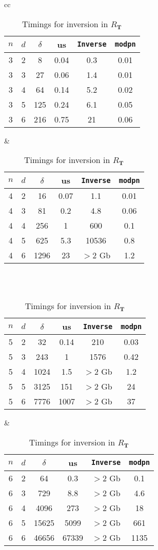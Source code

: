 \documentclass[12pt]{article}
\def\Tt {\ensuremath{\mathbf{T}}}
\begin{document}
\begin{table}
  \caption{Timings for inversion in $R_\Tt$}\label{table2}
  \begin{center}
  \begin{tabular}{cc}
  \begin{tabular}{c|c|c||c|c|c}
    $n$ & $d$ & $\delta$ & us & {\tt Inverse} & {\tt modpn} \\ \hline
3& 2& 8 & 0.04 & 0.3 & 0.01\\
3& 3& 27 & 0.06 & 1.4 & 0.01\\
3& 4& 64 & 0.14 & 5.2 & 0.02\\
3& 5& 125& 0.24& 6.1 & 0.05\\
3& 6& 216& 0.75& 21 & 0.06
  \end{tabular}
&
  \begin{tabular}{c|c|c||c|c|c}
    $n$ & $d$ & $\delta$ & us & {\tt Inverse} & {\tt modpn} \\ \hline
4& 2& 16& 0.07& 1.1& 0.01\\
4& 3& 81& 0.2 & 4.8 &0.06\\
4& 4& 256& 1& 600 & 0.1\\
4& 5& 625& 5.3& 10536& 0.8\\
4& 6& 1296& 23& $> 2$ Gb& 1.2
  \end{tabular} 
\\
\\
  \begin{tabular}{c|c|c||c|c|c}
    $n$ & $d$ & $\delta$ & us & {\tt Inverse} & {\tt modpn} \\ \hline
5& 2& 32  & 0.14 & 210 & 0.03\\
5& 3& 243  &1 & 1576 & 0.42\\
5& 4& 1024 &1.5& $> 2$ Gb &1.2\\
5& 5& 3125 &151 & $> 2$  Gb & 24\\
5& 6& 7776 &1007 & $> 2$  Gb & 37
  \end{tabular}
&
  \begin{tabular}{c|c|c||c|c|c}
    $n$ & $d$ & $\delta$ & us & {\tt Inverse} & {\tt modpn} \\ \hline
6& 2& 64 & 0.3 & $> 2$ Gb & 0.1\\
6& 3& 729 & 8.8 & $> 2$ Gb & 4.6\\
6& 4& 4096 & 273 & $> 2$ Gb & 18\\
6& 5& 15625 & 5099 & $> 2$ Gb &661\\
6& 6& 46656 & 67339 & $> 2$ Gb& 1135
  \end{tabular} 
  \end{tabular}
  \end{center}
\end{table}
\end{document}

